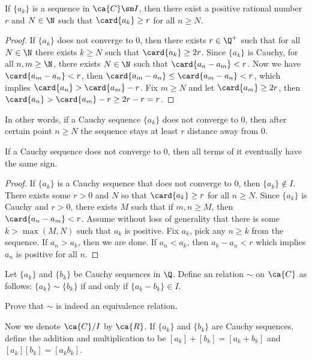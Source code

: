 \documentclass[10pt]{article}
\begin{document}
\begin{proposition}
    If $\{{a}_{k}\}$ is a sequence in $\ca{C}\sm I$, then there exist a positive rational number $r$ and $N\in\N$ such that $\card{{a}_{k}}\ge r$ for all $n\ge N$.
\end{proposition}
\begin{proof}
    If $\{{a}_{k}\}$ does not converge to 0, then there exists $r\in{\Q}^{+}$ such that for all $N\in\N$ there exists $k\ge N$ such that $\card{{a}_{k}}\ge 2r$. Since $\{{a}_{k}\}$ is Cauchy, for all $n,m\ge\N$, there exists $N\in\N$ such that $\card{{a}_{n}-{a}_{m}}<r$. Now we have $\card{{a}_{m}-{a}_{n}}<r$, then $\card{{a}_{m}-{a}_{n}}\le\card{{a}_{m}-{a}_{n}}<r$, which implies $\card{{a}_{n}}>\card{{a}_{m}}-r$. Fix $m\ge N$ and let $\card{{a}_{m}}\ge 2r$, then $\card{{a}_{n}}>\card{{a}_{m}}-r\ge 2r-r=r$.
\end{proof}
\par
In other words, if a Cauchy sequence $\{{a}_{k}\}$ does not converge to 0, then after certain point $n\ge N$ the sequence stays at least $r$ distance away from 0.
\begin{proposition}
    If a Cauchy sequence does not converge to 0, then all terms of it eventually have the same sign.
\end{proposition}
\begin{proof}
    If $\{{a}_{k}\}$ is a Cauchy sequence that does not converge to 0, then $\{{a}_{k}\}\notin I$. There exists some $r>0$ and $N$ so that $\card{{a}_{k}}\ge r$ for all $n\ge N$. Since $\{{a}_{k}\}$ is Cauchy and $r>0$, there exists $M$ such that if $m,n\ge M$, then $\card{{a}_{n}-{a}_{m}}< r$. Assume without loss of generality that there is some $k>\max(M,N)$ such that ${a}_{k}$ is positive. Fix ${a}_{k}$, pick any $n\ge k$ from the sequence. If ${a}_{n}>{a}_{k}$, then we are done. If ${a}_{n}<{a}_{k}$, then ${a}_{k}-{a}_{n}<r$ which implies ${a}_{n}$ is positive for all $n$.
\end{proof}
\par
Let $\{{a}_{k}\}$ and $\{{b}_{k}\}$ be Cauchy sequences in $\Q$. Define an relation $\sim$ on $\ca{C}$ as follows: $\{{a}_{k}\}\sim\{{b}_{k}\}$ if and only if $\{{a}_{k}-{b}_{k}\}\in I$. 
\begin{problem}
    Prove that $\sim$ is indeed an equivalence relation.
\end{problem}
\par
Now we denote $\ca{C}/I$ by $\ca{R}$. If $\{{a}_{k}\}$ and $\{{b}_{k}\}$ are Cauchy sequences, define the addition and multiplication to be $[{a}_{k}]+[{b}_{k}]=[{a}_{k}+{b}_{k}]$ and $[{a}_{k}][{b}_{k}]=[{a}_{k}{b}_{k}]$.
\end{document}
